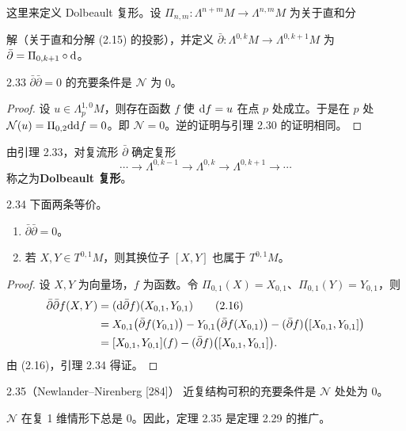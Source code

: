 这里来定义 Dolbeault 复形。设 $\Pi_{n,m}\colon\Lambda^{n+m}M\to\Lambda^{n,m}M$ 为关于直和分

解（关于直和分解 (2.15) 的投影），并定义 $\bar\partial\colon\Lambda^{0,k}M\to\Lambda^{0,k+1}M$ 为 $\bar\partial=\Pi_{0,k+1}\circ\mathrm{d}$。

\begin{lemma*}{2.33}
  $\bar\partial\bar\partial=0$ 的充要条件是 $\mathcal{N}$ 为 0。
\end{lemma*}

\begin{proof}
  设 $u\in\Lambda_p^{1,0}M$，则存在函数 $f$ 使 $\mathrm{d} f=u$ 在点 $p$ 处成立。于是在 $p$ 处 $\mathcal{N}(u)=\Pi_{0,2}\mathrm{d}\mathrm{d} f=0$。即 $\mathcal{N}=0$。逆的证明与引理 2.30 的证明相同。
\end{proof}

由引理 2.33，对复流形 $\bar\partial$ 确定复形
\[
  \cdots\to\Lambda^{0,k-1}\to\Lambda^{0,k}\to\Lambda^{0,k+1}\to\cdots
\]
称之为\textbf{Dolbeault 复形}。

\begin{lemma*}{2.34}
  下面两条等价。
  \begin{enumerate}[label=(\arabic*),leftmargin=2.2em,itemsep=1pt,topsep=2pt]
    \item $\bar\partial\bar\partial=0$。
    \item 若 $X,Y\in T^{0,1}M$，则其换位子 $[X,Y]$ 也属于 $T^{0,1}M$。
  \end{enumerate}
\end{lemma*}

\begin{proof}
  设 $X,Y$ 为向量场，$f$ 为函数。令 $\Pi_{0,1}(X)=X_{0,1}$、$\Pi_{0,1}(Y)=Y_{0,1}$，则
  \begin{align}
    \bar\partial\bar\partial f(X,Y)&=(\mathrm{d}\bar\partial f)(X_{0,1},Y_{0,1}) \tag{2.16}\\
    &=X_{0,1}\bigl(\bar\partial f(Y_{0,1})\bigr)-Y_{0,1}\bigl(\bar\partial f(X_{0,1})\bigr)-(\bar\partial f)\bigl([X_{0,1},Y_{0,1}]\bigr)\\
    &=[X_{0,1},Y_{0,1}](f)-(\bar\partial f)\bigl([X_{0,1},Y_{0,1}]\bigr).
  \end{align}
  由 (2.16)，引理 2.34 得证。
\end{proof}

\begin{theorem}{2.35}（Newlander–Nirenberg [284]）
  近复结构可积的充要条件是 $\mathcal{N}$ 处处为 0。
\end{theorem}

$\mathcal{N}$ 在复 1 维情形下总是 0。因此，定理 2.35 是定理 2.29 的推广。

